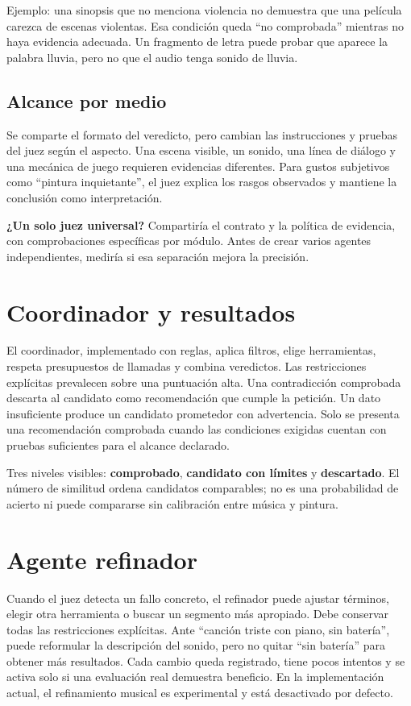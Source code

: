 \documentclass[11pt,a4paper]{article}
\begin{document}
Ejemplo: una sinopsis que no menciona violencia no demuestra que una película carezca de escenas violentas. Esa condición queda ``no comprobada'' mientras no haya evidencia adecuada. Un fragmento de letra puede probar que aparece la palabra lluvia, pero no que el audio tenga sonido de lluvia.

\subsection{Alcance por medio}
Se comparte el formato del veredicto, pero cambian las instrucciones y pruebas del juez según el aspecto. Una escena visible, un sonido, una línea de diálogo y una mecánica de juego requieren evidencias diferentes. Para gustos subjetivos como ``pintura inquietante'', el juez explica los rasgos observados y mantiene la conclusión como interpretación.

\textbf{¿Un solo juez universal?} Compartiría el contrato y la política de evidencia, con comprobaciones específicas por módulo. Antes de crear varios agentes independientes, mediría si esa separación mejora la precisión.

\section{Coordinador y resultados}
El coordinador, implementado con reglas, aplica filtros, elige herramientas, respeta presupuestos de llamadas y combina veredictos. Las restricciones explícitas prevalecen sobre una puntuación alta. Una contradicción comprobada descarta al candidato como recomendación que cumple la petición. Un dato insuficiente produce un candidato prometedor con advertencia. Solo se presenta una recomendación comprobada cuando las condiciones exigidas cuentan con pruebas suficientes para el alcance declarado.

Tres niveles visibles: \textbf{comprobado}, \textbf{candidato con límites} y \textbf{descartado}. El número de similitud ordena candidatos comparables; no es una probabilidad de acierto ni puede compararse sin calibración entre música y pintura.

\section{Agente refinador}
Cuando el juez detecta un fallo concreto, el refinador puede ajustar términos, elegir otra herramienta o buscar un segmento más apropiado. Debe conservar todas las restricciones explícitas. Ante ``canción triste con piano, sin batería'', puede reformular la descripción del sonido, pero no quitar ``sin batería'' para obtener más resultados. Cada cambio queda registrado, tiene pocos intentos y se activa solo si una evaluación real demuestra beneficio. En la implementación actual, el refinamiento musical es experimental y está desactivado por defecto.
\end{document}
